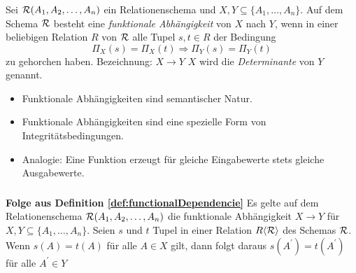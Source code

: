 \begin{frame}[t]\frametitle{\insertsection}
\framesubtitle{\insertsubsection}
\begin{definition}
	\label{def:functionalDependencie}
	Sei $\mathcal{R}(A_1,A_2,\ldots,A_n)$ ein Relationenschema und $X, Y\subseteq \{A_1,\ldots,A_n\}$.
	\nl 
	Auf dem Schema $\mathcal{R}$ besteht eine \emph{funktionale Abh\"angigkeit} von $X$ nach $Y$, wenn in einer beliebigen 
	Relation $R$ von $\mathcal{R}$ alle Tupel $s,t\in R$ der Bedingung
	\begin{equation*}
	\Pi_X(s) = \Pi_X(t) \Rightarrow \Pi_Y(s) = \Pi_Y(t)
	\end{equation*}
	zu gehorchen haben. Bezeichnung: $X\rightarrow Y$
	\abs
	$X$ wird die \emph{Determinante} von $Y$ genannt.
\end{definition}
\onslide\pause 
\begin{itemize}
	\item Funktionale Abhängigkeiten sind semantischer Natur.
	\item Funktionale Abhängigkeiten sind eine spezielle Form von Integrit\"atsbedingungen.
	\item Analogie: Eine Funktion erzeugt für gleiche Eingabewerte stets gleiche Ausgabewerte.
\end{itemize}
\end{frame}

\begin{frame}[t]\frametitle{\insertsection}
\framesubtitle{\insertsubsection}
\begin{block}{\textbf{Folge aus Definition \ref{def:functionalDependencie}}}
	\abs
	Es gelte auf dem Relationenschema $\mathcal{R}(A_1,A_2,\ldots,A_n)$ die funktionale Abhängigkeit $X\rightarrow Y$ für  
	$X, Y\subseteq \{A_{1},\ldots,A_{n}\}$. Seien $s$ und $t$ 
	Tupel in einer Relation $R\langle\mathcal{R}\rangle$ des Schemas $\mathcal{R}$. Wenn $s(A)=t(A)$ f\"ur alle 
	$A\in X$ gilt, dann folgt daraus $s(A^\prime)=t(A^\prime)$ f\"ur alle $A^\prime\in Y$
\end{block}
\end{frame}

